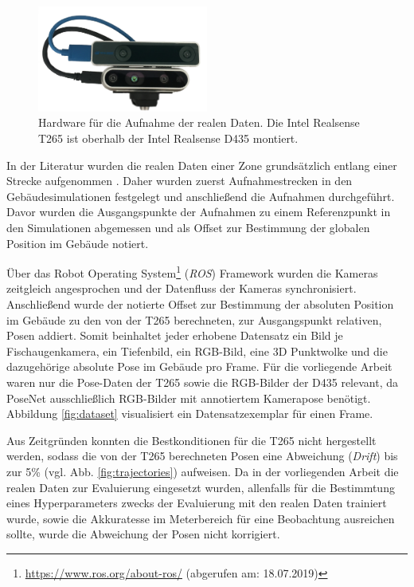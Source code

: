 \begin{figure}
	\centering
	\includegraphics[width=0.5\textwidth]{images/real_dataset/t265_d435_2.png}
	\caption{Hardware für die Aufnahme der realen Daten. Die Intel Realsense T265 ist oberhalb der Intel Realsense D435 montiert.}
	\label{fig:t265_d435}
\end{figure}

In der Literatur wurden die realen Daten einer Zone grundsätzlich entlang einer Strecke aufgenommen \cite{kendallPoseNetConvolutionalNetwork2015, clarkVidLocDeepSpatioTemporal2017, acharyaBIMPoseNetIndoorCamera2019}. Daher wurden zuerst Aufnahmestrecken in den Gebäudesimulationen festgelegt und anschließend die Aufnahmen durchgeführt. Davor wurden die Ausgangspunkte der Aufnahmen zu einem Referenzpunkt in den Simulationen abgemessen und als Offset zur Bestimmung der globalen Position im Gebäude notiert.


Über das Robot Operating System\footnote{\url{https://www.ros.org/about-ros/} (abgerufen am: 18.07.2019)} (\textit{ROS}) Framework wurden die Kameras zeitgleich angesprochen und der Datenfluss der Kameras synchronisiert. Anschließend wurde der notierte Offset zur Bestimmung der absoluten Position im Gebäude zu den von der T265 berechneten, zur Ausgangspunkt relativen, Posen addiert. Somit beinhaltet jeder erhobene Datensatz ein Bild je Fischaugenkamera, ein Tiefenbild, ein RGB-Bild, eine 3D Punktwolke und die dazugehörige absolute Pose im Gebäude pro Frame. Für die vorliegende Arbeit waren nur die Pose-Daten der T265 sowie die RGB-Bilder der D435 relevant, da PoseNet ausschließlich RGB-Bilder mit annotiertem Kamerapose benötigt. Abbildung \ref{fig:dataset} visualisiert ein Datensatzexemplar für einen Frame.

Aus Zeitgründen konnten die Bestkonditionen für die T265 nicht hergestellt werden, sodass die von der T265 berechneten Posen eine Abweichung (\textit{Drift}) bis zur 5\% (vgl. Abb. \ref{fig:trajectories}) aufweisen. Da in der vorliegenden Arbeit die realen Daten zur Evaluierung eingesetzt wurden, allenfalls für die Bestimmtung eines Hyperparameters zwecks der Evaluierung mit den realen Daten trainiert wurde, sowie die Akkuratesse im Meterbereich für eine Beobachtung ausreichen sollte, wurde die Abweichung der Posen nicht korrigiert.


